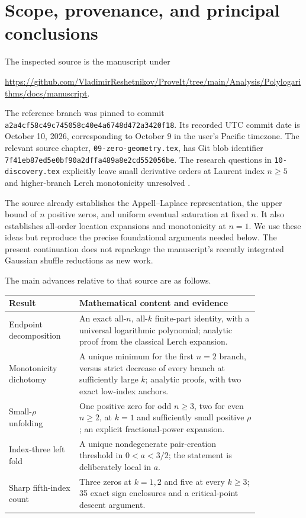 \documentclass[11pt]{article}
\numberwithin{equation}{section}
\theoremstyle{definition}\newtheorem{definition}[theorem]{Definition}
\theoremstyle{remark}\newtheorem{remark}[theorem]{Remark}
\newcommand{\sha}{\texttt{a2a4cf58c49c745058c40e4a6748d472a3420f18}}
\begin{document}
\section{Scope, provenance, and principal conclusions}\label{sec:scope}
The inspected source is the manuscript under
\begin{center}\small
\url{https://github.com/VladimirReshetnikov/ProveIt/tree/main/Analysis/Polylogarithms/docs/manuscript}.
\end{center}
The reference branch was pinned to commit \sha. Its recorded UTC commit date is October 10, 2026, corresponding to October 9 in the user's Pacific timezone. The relevant source chapter, \texttt{09-zero-geometry.tex}, has Git blob identifier
\texttt{7f41eb87ed5e0bf90a2dffa489a8e2cd552056be}.
The research questions in \texttt{10-discovery.tex} explicitly leave small derivative orders at Laurent index $n\geq5$ and higher-branch Lerch monotonicity unresolved \cite{repozeros,repodiscovery}.

The source already establishes the Appell--Laplace representation, the upper bound of $n$ positive zeros, and uniform eventual saturation at fixed $n$. It also establishes all-order location expansions and monotonicity at $n=1$. We use these ideas but reproduce the precise foundational arguments needed below. The present continuation does not repackage the manuscript's recently integrated Gaussian shuffle reductions as new work.

The main advances relative to that source are as follows.
\begin{center}\small
\begin{tabular}{p{0.23\linewidth}p{0.61\linewidth}}
\toprule
Result & Mathematical content and evidence\\
\midrule
Endpoint decomposition & An exact all-$n$, all-$k$ finite-part identity, with a universal logarithmic polynomial; analytic proof from the classical Lerch expansion.\\[3pt]
Monotonicity dichotomy & A unique minimum for the first $n=2$ branch, versus strict decrease of every branch at sufficiently large $k$; analytic proofs, with two exact low-index anchors.\\[3pt]
Small-$\rho$ unfolding & One positive zero for odd $n\geq3$, two for even $n\geq2$, at $k=1$ and sufficiently small positive $\rho$; an explicit fractional-power expansion.\\[3pt]
Index-three left fold & A unique nondegenerate pair-creation threshold in $0<a<3/2$; the statement is deliberately local in $a$.\\[3pt]
Sharp fifth-index count & Three zeros at $k=1,2$ and five at every $k\geq3$; 35 exact sign enclosures and a critical-point descent argument.\\
\bottomrule
\end{tabular}
\end{center}
\end{document}
